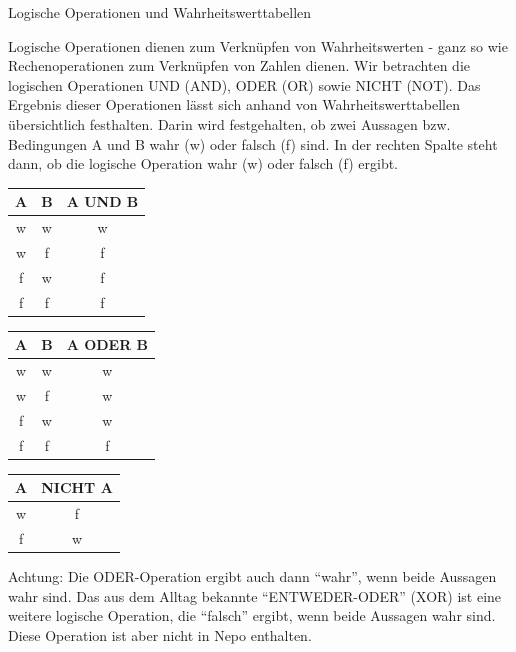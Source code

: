 \begin{zsfg}{Logische Operationen und Wahrheitswerttabellen}
	
	Logische Operationen dienen zum Verknüpfen von Wahrheitswerten - ganz so wie Rechenoperationen zum Verknüpfen von Zahlen dienen. Wir betrachten die logischen Operationen UND (AND), ODER (OR) sowie NICHT (NOT). Das Ergebnis dieser Operationen lässt sich anhand von Wahrheitswerttabellen übersichtlich festhalten. Darin wird festgehalten, ob zwei Aussagen bzw. Bedingungen A und B wahr (w) oder falsch (f) sind. In der rechten Spalte steht dann, ob die logische Operation wahr (w) oder falsch (f) ergibt.
	
	\medskip
	\begin{minipage}{0.3\textwidth}
		\centering
		\begin{tabular}{c | c | c}
			\textbf{A} & \textbf{B} & \textbf{A UND B} \\ \hline
			w & w & w \\
			w & f & f \\
			f & w & f \\
			f & f & f \\  
		\end{tabular}
	\end{minipage}
	\hfill
	\begin{minipage}{0.3\textwidth}
		\centering
		\begin{tabular}{c | c | c}
			\textbf{A} & \textbf{B} & \textbf{A ODER B} \\ \hline
			w & w & w \\
			w & f & w \\
			f & w & w \\
			f & f & f \\  
		\end{tabular}
	\end{minipage}
	\hfill
	\begin{minipage}[t]{0.3\textwidth}
		\centering
		\begin{tabular}{c | c}
			\textbf{A}  & \textbf{NICHT A} \\ \hline
			w & f \\
			f & w \\  
		\end{tabular}
	\end{minipage}
	
	\medskip
	Achtung: Die ODER-Operation ergibt auch dann \enquote{wahr}, wenn beide Aussagen wahr sind. Das aus dem Alltag bekannte \enquote{ENTWEDER-ODER} (XOR) ist eine weitere logische Operation, die \enquote{falsch} ergibt, wenn beide Aussagen wahr sind. Diese Operation ist aber nicht in Nepo enthalten.
\end{zsfg}

